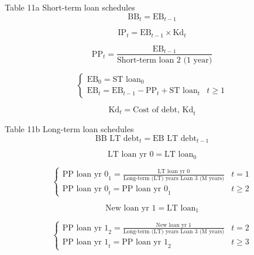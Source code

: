 \documentclass[12pt]{article}
\numberwithin{equation}{section}
\begin{document}
Table 11a Short-term loan schedules
\begin{equation}
	\text{BB}_{t} = \text{EB}_{t-1}
\end{equation}

\begin{equation}
	\text{IP}_{t} = \text{EB}_{t-1} \times \text{Kd}_{t}
\end{equation}

\begin{equation}
	\text{PP}_{t} = \frac{\text{EB}_{t-1}}{\text{Short-term loan 2 (1 year)}}
\end{equation}

\begin{equation}
	\begin{cases}
		\text{EB}_{0} = \text{ST loan}_{0} &  \\
		\text{EB}_{t} = \text{EB}_{t-1} -  \text{PP}_{t} +\text{ST loan}_{t} & t \geq 1
	\end{cases}
\end{equation}

\begin{equation}
	\text{Kd}_{t} = \text{Cost of debt, Kd}_{t}
\end{equation}


Table 11b Long-term loan schedules
\begin{equation}
	\text{BB LT debt}_{t} = \text{EB LT debt}_{t-1}
\end{equation}

\begin{equation}
	\text{LT loan yr 0} = \text{LT loan}_{0}
\end{equation}

\begin{equation}
	\begin{cases}
		\text{PP loan yr 0}_{1} = \frac{\text{LT loan yr 0}}{\text{Long-term (LT) years Loan 3 (M years)}} & t=1 \\
		\text{PP loan yr 0}_{t} = \text{PP loan yr 0}_{1} & t \geq 2
	\end{cases}
\end{equation}

\begin{equation}
	\text{New loan yr 1} = \text{LT loan}_{1}
\end{equation}

\begin{equation}
	\begin{cases}
		\text{PP loan yr 1}_{2} = \frac{\text{New loan yr 1}}{\text{Long-term (LT) years Loan 3 (M years)}} & t = 2 \\
		\text{PP loan yr 1}_{t} = \text{PP loan yr 1}_{2} & t \geq 3
	\end{cases}
\end{equation}
\end{document}
